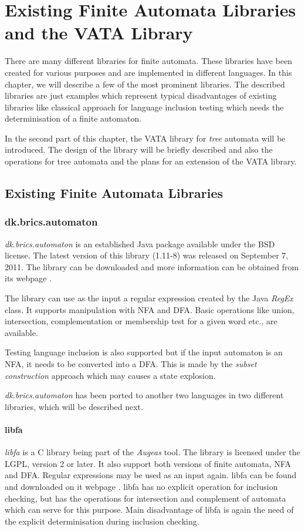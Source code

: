 \chapter{Existing Finite Automata Libraries and the VATA Library} 
\label{libraries}
There are many different libraries for finite automata. These libraries have been created for various purposes and 
are implemented in different languages. 
In this chapter, we will describe a few of the most prominent libraries. 
The described libraries are just examples which represent typical disadvantages of existing libraries like
classical approach for language inclusion testing which needs the determinisation of a finite automaton. 

In the second part of this chapter, the VATA library for \emph{tree} automata will be introduced. 
The design of the library will be briefly described and also the operations for tree
automata and the plans for an extension of the VATA library.

\section{Existing Finite Automata Libraries}
\label{existinglibraries}
\subsection{dk.brics.automaton}
\label{brics}
\emph{dk.brics.automaton} is an established Java package available under the BSD license. The latest version of this library (1.11-8) 
was released on September 7, 2011.
The library can be downloaded and more information can be obtained from its webpage \cite{brics}. 

The library can use as the input a regular expression created by the Java \emph{RegEx} class.
It supports manipulation with NFA and DFA. Basic operations like union,
intersection, complementation or membership test for a given word etc., are available.

Testing language inclusion is also supported but if the input automaton is an NFA, it needs to be converted into a DFA. 
This is made by the \emph{subset construction} approach which may causes a state explosion.

\emph{dk.brics.automaton} has been ported to another two languages in two different libraries, which will be described next.

\subsubsection{libfa}
\emph{libfa} is a C library being part of the \emph{Augeas} tool. 
The library is licensed under the LGPL, version 2 or later. It also support both versions of finite automata, NFA and DFA. 
Regular expressions may be used as an input again.
libfa can be found and downloaded on it webpage \cite{libfa}.
libfa has no explicit operation for inclusion checking, but has the operations for intersection and complement of automata
which can serve for this purpose.
Main disadvantage of libfa is again the need of the explicit determinisation during inclusion checking.

